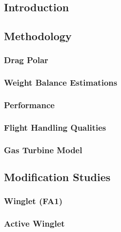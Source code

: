 \subsection{Introduction}
	

\subsection{Methodology}
        \subsubsection{Drag Polar}
	        
        \subsubsection{Weight Balance Estimations}
	        
        \subsubsection{Performance}
	        
        \subsubsection{Flight Handling Qualities}
	        
        \subsubsection{Gas Turbine Model}
            


\subsection{Modification Studies}
	\subsubsection{Winglet (FA1)}
		
	\subsubsection{Active Winglet}
		
